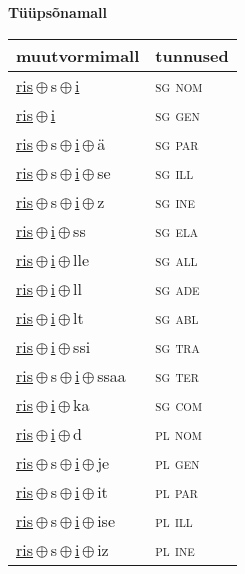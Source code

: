 

\vspace{3.5em}
\noindent \begin{minipage}{\textwidth}
\noindent \textbf{Tüüpsõnamall \,}\\

\begin{sideways}
\begin{tabular}{l l}
muutvormimall & tunnused \\
\hline
\underline{ris}\,$\oplus$\,s\,$\oplus$\,\underline{i} & \textsc{ sg nom } \\
\underline{ris}\,$\oplus$\,\underline{i} & \textsc{ sg gen } \\
\underline{ris}\,$\oplus$\,s\,$\oplus$\,\underline{i}\,$\oplus$\,ä & \textsc{ sg par } \\
\underline{ris}\,$\oplus$\,s\,$\oplus$\,\underline{i}\,$\oplus$\,se & \textsc{ sg ill } \\
\underline{ris}\,$\oplus$\,s\,$\oplus$\,\underline{i}\,$\oplus$\,z & \textsc{ sg ine } \\
\underline{ris}\,$\oplus$\,\underline{i}\,$\oplus$\,ss & \textsc{ sg ela } \\
\underline{ris}\,$\oplus$\,\underline{i}\,$\oplus$\,lle & \textsc{ sg all } \\
\underline{ris}\,$\oplus$\,\underline{i}\,$\oplus$\,ll & \textsc{ sg ade } \\
\underline{ris}\,$\oplus$\,\underline{i}\,$\oplus$\,lt & \textsc{ sg abl } \\
\underline{ris}\,$\oplus$\,\underline{i}\,$\oplus$\,ssi & \textsc{ sg tra } \\
\underline{ris}\,$\oplus$\,s\,$\oplus$\,\underline{i}\,$\oplus$\,ssaa & \textsc{ sg ter } \\
\underline{ris}\,$\oplus$\,\underline{i}\,$\oplus$\,ka & \textsc{ sg com } \\
\underline{ris}\,$\oplus$\,\underline{i}\,$\oplus$\,d & \textsc{ pl nom } \\
\underline{ris}\,$\oplus$\,s\,$\oplus$\,\underline{i}\,$\oplus$\,je & \textsc{ pl gen } \\
\underline{ris}\,$\oplus$\,s\,$\oplus$\,\underline{i}\,$\oplus$\,it & \textsc{ pl par } \\
\underline{ris}\,$\oplus$\,s\,$\oplus$\,\underline{i}\,$\oplus$\,ise & \textsc{ pl ill } \\
\underline{ris}\,$\oplus$\,s\,$\oplus$\,\underline{i}\,$\oplus$\,iz & \textsc{ pl ine } \\

\end{tabular}
\end{sideways}
\end{minipage}
